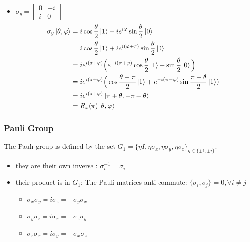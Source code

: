 \documentclass{article}
\begin{document}
\begin{itemize}[label=-]
    \item $\sigma_y = \begin{bmatrix}
        0 & -i \\ i & 0
    \end{bmatrix}$
    \begin{equation}
        \begin{aligned}
            \sigma_y\ket{\theta, \varphi}
                & = i\cos\frac{\theta}{2}\ket{1} - ie^{i\varphi}\sin\frac{\theta}{2}\ket{0} \\
                & = i\cos\frac{\theta}{2}\ket{1} + ie^{i(\varphi+\pi)}\sin\frac{\theta}{2}\ket{0}\\
                & = ie^{i(\pi+\varphi)}\Big(e^{-i(\pi+\varphi)}\cos\frac{\theta}{2}\ket{1}+\sin\frac{\theta}{2}\ket{0}\Big) \\
                & = ie^{i(\pi+\varphi)}\Big(\cos\frac{\theta-\pi}{2}\ket{1}+e^{-i(\pi-\varphi)}\sin\frac{\pi-\theta}{2}\ket{1}) \\
                & = ie^{i(\pi+\varphi)}\ket{\pi+\theta, -\pi-\theta} \\
                & = R_x(\pi)\ket{\theta, \varphi}
        \end{aligned}
    \end{equation}

\end{itemize}

\newpage
\subsubsection{Pauli Group}
The Pauli group is defined by the set $G_1 = \{\eta I, \eta\sigma_x, \eta\sigma_y, \eta\sigma_z\}_{\eta\in\{\pm 1, \pm i\}}$.
\begin{itemize}
    \item they are their own inverse : $\sigma_i^{-1}=\sigma_i$
    \item their product is in $G_1$:
    The Pauli matrices anti-commute: $\{\sigma_i, \sigma_j\} = 0, \forall i \neq j$
    \begin{itemize}
        \item $\sigma_x\sigma_y=i\sigma_z=-\sigma_y\sigma_x$
        \item $\sigma_y\sigma_z=i\sigma_x=-\sigma_z\sigma_y$
        \item $\sigma_z\sigma_x=i\sigma_y=-\sigma_x\sigma_z$
    \end{itemize}
\end{itemize}
\end{document}
